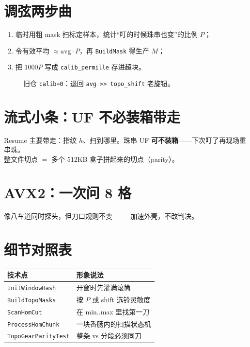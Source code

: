 \section{调弦两步曲}

\begin{enumerate}
  \item 临时用粗 mask 扫标定样本，统计``叮的时候珠串也变''的比例 $P$；
  \item 令有效平均 $\approx \mathrm{avg}\cdot P$，再 \texttt{BuildMask} 得生产 $M$；
  \item 把 $1000P$ 写成 \texttt{calib\_permille} 存进超块。
\end{enumerate}

\begin{figure}[htbp]
\centering
{}
\caption{旧仓 \texttt{calib=0}：退回 \texttt{avg >> topo\_shift} 老旋钮。}
\label{fig:hom-calib-pipe}
\end{figure}

\section{流式小条：UF 不必装箱带走}

Resume 主要带走：指纹 $h$、扫到哪里。珠串 UF \textbf{可不装箱}——下次叮了再现场重串珠。\\
整文件切点 $=$ 多个 512KB 盒子拼起来的切点（parity）。

\section{AVX2：一次问 8 格}

像八车道同时探头，但刀口规则不变 —— 加速外壳，不改判决。

\section{细节对照表}

\begin{center}
\small
\begin{tabular}{@{}lp{7.5cm}@{}}
\toprule
技术点 & 形象说法 \\
\midrule
\texttt{InitWindowHash} & 开窗时先灌满滚筒 \\
\texttt{BuildTopoMasks} & 按 $P$ 或 shift 选铃灵敏度 \\
\texttt{ScanHomCut} & 在 min..max 里找第一刀 \\
\texttt{ProcessHomChunk} & 一块香肠内的扫描状态机 \\
\texttt{TopoGearParityTest} & 整条 vs 分段必须同刀 \\
\bottomrule
\end{tabular}
\end{center}
